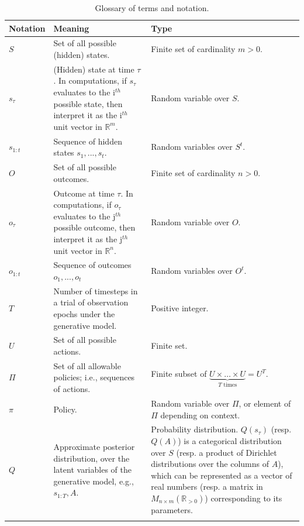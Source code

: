 \documentclass[review,12pt,authoryear]{elsarticle}
\begin{document}
\begin{longtabu} to \textwidth {
    X[1,c]
    X[4,c]
    X[3,c]}
    \caption{Glossary of terms and notation.} \label{table:2} \\
            \toprule
            Notation & Meaning & Type \\
            \midrule
$S$ &	Set of all possible (hidden) states. & Finite set of cardinality $m>0$.\\\addlinespace[0.3cm]

$s_\tau$ & (Hidden) state at time $\tau$. In computations, if $s_\tau$ evaluates to the i$^{th}$ possible state, then interpret it as the i$^{th}$ unit vector in $\mathbb R^m$. &
Random variable over $S$. \\\addlinespace[0.3cm]

$s_{1:t}$ & Sequence of hidden states $s_1,...,s_t$. & Random variables over $S^t$. \\\addlinespace[0.3cm]

$O$ &	Set of all possible outcomes. &	Finite set of cardinality $n>0$.\\\addlinespace[0.3cm]

$o_\tau$& Outcome at time $\tau$. In computations, if $o_\tau$ evaluates to the j$^{th}$ possible outcome, then interpret it as the j$^{th}$ unit vector in $\mathbb R^n$. &
Random variable over $O$. \\\addlinespace[0.3cm]

$o_{1:t}$ & Sequence of outcomes $o_1,...,o_t$ & Random variables over $O^t$.\\\addlinespace[0.3cm]
 
$T$ & Number of timesteps in a trial of observation epochs under the generative model. & Positive integer. \\\addlinespace[0.3cm]

$U$ & Set of all possible actions. & Finite set.\\\addlinespace[0.3cm]
 
$\Pi$ & Set of all allowable policies; i.e., sequences of actions. & Finite subset of $\underbrace{U \times \ldots \times U}_{T \text{ times}} =U^T$. \\\addlinespace[0.3cm]

$\pi$ & Policy. & Random variable over $\Pi$, or element of $\Pi$ depending on context.
\\\addlinespace[0.3cm]

$Q$ & Approximate posterior distribution, over the latent variables of the generative model, e.g., $s_{1:T},A$. & Probability distribution. $Q(s_{\tau})$ (resp. $Q(A)$) is a categorical distribution over $S$ (resp. a product of Dirichlet distributions over the columns of $A$), which can be represented as a vector of real numbers (resp. a matrix in $M_{n\times m}(\mathbb R_{>0})$) corresponding to its parameters. \\\addlinespace[0.3cm]
 

\end{longtabu}
\end{document}
